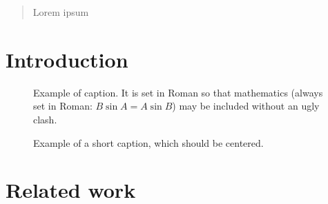 \documentclass[10pt,twocolumn,letterpaper]{article}
\begin{document}
\title{}

\author{Thomas Steiner\\
Google Germany GmbH\\
ABC Str. 19\\
{\tt\small tomac@google.com}
\and
Ruben Verborgh\\
Ghent University -- IBBT, ELIS -- Multimedia Lab\\
Gaston Crommenlaan 8 bus 201, B-9050 Ledeberg-Ghent, Belgium
{\small ruben.verborgh@ugent.be}
}

\maketitle

\begin{abstract}
   Lorem ipsum
\end{abstract}

\section{Introduction}



\begin{figure}[t]
\begin{center}
\fbox{\rule{0pt}{2in} \rule{0.9\linewidth}{0pt}}
\end{center}
   \caption{Example of caption.  It is set in Roman so that mathematics
   (always set in Roman: $B \sin A = A \sin B$) may be included without an
   ugly clash.}
\label{fig:long}
\label{fig:onecol}
\end{figure}


\begin{figure*}
\begin{center}
\fbox{\rule{0pt}{2in} \rule{.9\linewidth}{0pt}}
\end{center}
   \caption{Example of a short caption, which should be centered.}
\label{fig:short}
\end{figure*}


\section{Related work}
\end{document}
